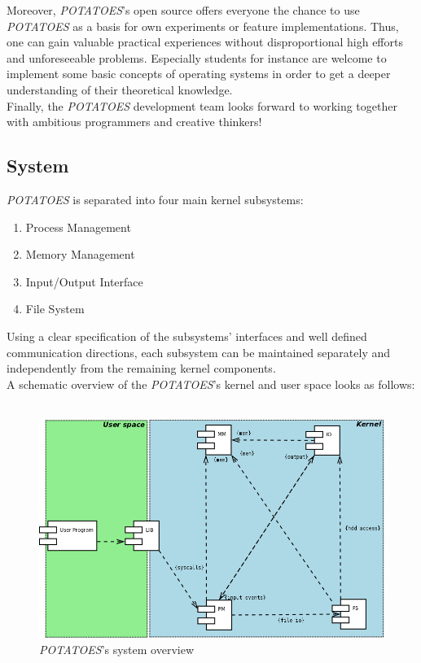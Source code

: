 \documentclass[11pt,a4paper]{scrartcl}
\begin{document}
Moreover, \textit{POTATOES}'s open source offers everyone the chance to use \textit{POTATOES} as a basis for own experiments or feature implementations. Thus, one can gain valuable practical experiences without disproportional high efforts and unforeseeable problems. Especially students for instance are welcome to implement some basic concepts of operating systems in order to get a deeper understanding of their theoretical knowledge.\\

Finally, the \textit{POTATOES} development team looks forward to working together with ambitious programmers and creative thinkers!

\pagebreak

\subsection{System}
\textit{POTATOES} is separated into four main kernel subsystems: 
\begin{enumerate}
	\item Process Management
	\item Memory Management
	\item Input/Output Interface
	\item File System
\end{enumerate}

Using a clear specification of the subsystems' interfaces and well defined communication directions, each subsystem can be maintained separately and independently from the remaining kernel components.\\

A schematic overview of the \textit{POTATOES}'s kernel and user space looks as follows:\\\\

\begin{figure}[h]
\includegraphics[width=\textwidth]{subsystems.png}
\caption{\textit{POTATOES}'s system overview}
\end{figure}
\pagebreak
\end{document}

